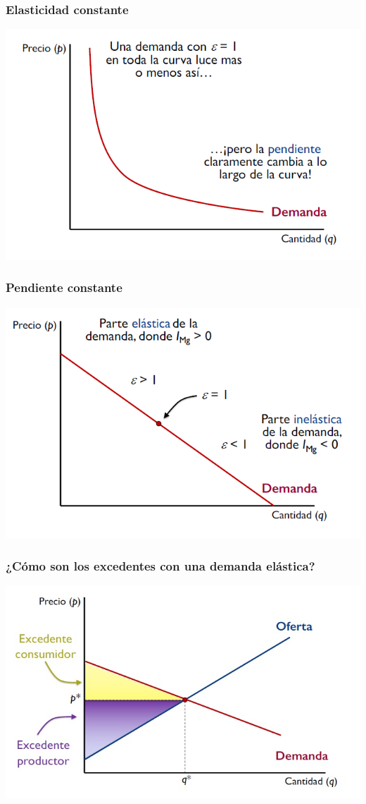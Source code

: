 \documentclass{beamer}
\begin{document}
\begin{frame}
\frametitle{Elasticidad constante}
\includegraphics[scale=0.6]{Figures/Tema_06.45_elasticidad.png}
\end{frame}

\begin{frame}
\frametitle{Pendiente constante}
\includegraphics[scale=0.6]{Figures/Tema_06.46_elasticidad2.png}
\end{frame}

\begin{frame}
\frametitle{ ¿Cómo son los excedentes con una demanda elástica?}
\includegraphics[scale=0.6]{Figures/Tema_07.24_equilibrioyexcedente2.jpg}
\end{frame}
\end{document}
